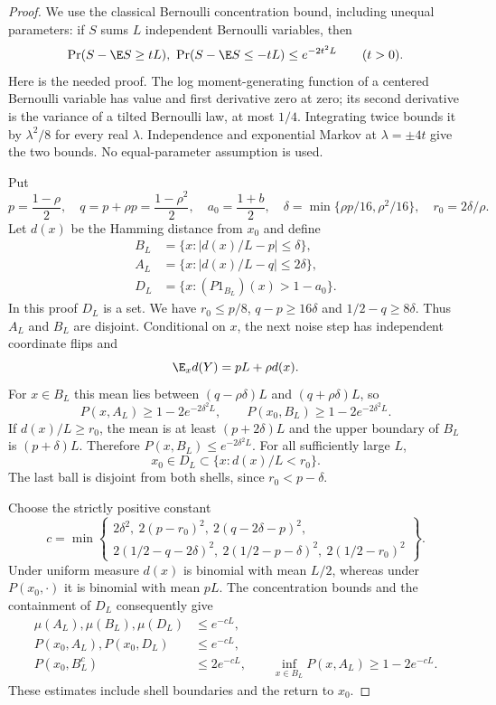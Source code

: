 \begin{proof}
We use the classical Bernoulli concentration bound, including unequal
parameters: if $S$ sums $L$ independent Bernoulli variables, then
\[
 \Pr(S-\E S\geq tL),\ \Pr(S-\E S\leq-tL)
       \leq e^{-2t^2L}\qquad(t>0).
\]
Here is the needed proof. The log moment-generating function of a
centered Bernoulli variable has value and first derivative zero at zero;
its second derivative is the variance of a tilted Bernoulli law, at most
$1/4$. Integrating twice bounds it by $\lambda^2/8$ for every real
$\lambda$. Independence and exponential Markov at $\lambda=\pm4t$
give the two bounds. No equal-parameter assumption is used.

Put
\[
 p=\frac{1-\rho}{2},\quad q=p+\rho p=\frac{1-\rho^2}{2},\quad
 a_0=\frac{1+b}{2},\quad
 \delta=\min\{\rho p/16,\rho^2/16\},\quad r_0=2\delta/\rho.
\]
Let $d(x)$ be the Hamming distance from $x_0$ and define
\begin{align*}
 B_L&=\{x:|d(x)/L-p|\leq\delta\},\\
 A_L&=\{x:|d(x)/L-q|\leq2\delta\},\\
 D_L&=\{x:(P1_{B_L})(x)>1-a_0\}.
\end{align*}
In this proof $D_L$ is a set. We have $r_0\leq p/8$,
$q-p\geq16\delta$ and $1/2-q\geq8\delta$. Thus $A_L$ and $B_L$
are disjoint. Conditional on $x$, the next noise step has independent
coordinate flips and
\[
 \E_x d(Y)=pL+\rho d(x).
\]
For $x\in B_L$ this mean lies between $(q-\rho\delta)L$ and
$(q+\rho\delta)L$, so
\[
 P(x,A_L)\geq1-2e^{-2\delta^2L},\qquad
 P(x_0,B_L)\geq1-2e^{-2\delta^2L}.
\]
If $d(x)/L\geq r_0$, the mean is at least $(p+2\delta)L$ and the
upper boundary of $B_L$ is $(p+\delta)L$. Therefore
$P(x,B_L)\leq e^{-2\delta^2L}$. For all sufficiently large $L$,
\[
 x_0\in D_L\subset\{x:d(x)/L<r_0\}.
\]
The last ball is disjoint from both shells, since $r_0<p-\delta$.

Choose the strictly positive constant
\[
 c=\min\left\{
 \begin{gathered}
 2\delta^2,\ 2(p-r_0)^2,\ 2(q-2\delta-p)^2,\\
 2(1/2-q-2\delta)^2,\ 2(1/2-p-\delta)^2,\ 2(1/2-r_0)^2
 \end{gathered}\right\}.
\]
Under uniform measure $d(x)$ is binomial with mean $L/2$, whereas
under $P(x_0,\cdot)$ it is binomial with mean $pL$. The concentration
bounds and the containment of $D_L$ consequently give
\begin{align}
 \mu(A_L),\mu(B_L),\mu(D_L)&\leq e^{-cL},\nonumber\\
 P(x_0,A_L),P(x_0,D_L)&\leq e^{-cL},\nonumber\\
 P(x_0,B_L^c)&\leq2e^{-cL},\qquad
 \inf_{x\in B_L}P(x,A_L)\geq1-2e^{-cL}.
 \label{denominatorshellbounds}
\end{align}
These estimates include shell boundaries and the return to $x_0$.


\end{proof}
